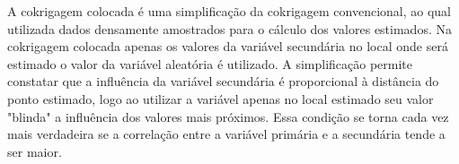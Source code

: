  A cokrigagem colocada é uma simplificação da cokrigagem convencional, ao qual utilizada dados densamente amostrados para o cálculo dos valores estimados. Na cokrigagem colocada apenas os valores da variável secundária no local onde será estimado o valor da variável aleatória é utilizado.  A simplificação permite constatar que a influência da variável secundária é proporcional à distância do ponto estimado, logo ao utilizar a variável apenas no local estimado seu valor "blinda" a influência dos valores mais próximos. Essa condição se torna cada vez mais verdadeira se a correlação entre a variável primária e a secundária tende a ser maior.  

 